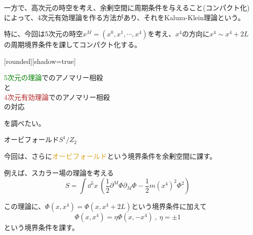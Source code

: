 \documentclass[
  unicode,a4paper,10pt,
  xcolor = {dvipsnames,svgnames},
  hyperref ={colorlinks=true,citecolor=Navy,linkcolor=NavyBlue,urlcolor=purple},
  ja=standard,lualatex
]{beamer}
\begin{document}
\begin{frame}{\subsecname}

  一方で、高次元の時空を考え、余剰空間に周期条件を与えること(コンパクト化)によって、4次元有効理論を作る方法があり、それをKaluza-Klein理論という。

  \vspace*{5pt}

  特に、今回は5次元の時空$x^{M}=(x^{0},x^{1},\cdots,x^{4})$を考え、$x^{4}$の方向に$x^{4}\sim x^{4}+2L$の周期境界条件を課してコンパクト化する。

  \pause
  \vspace*{10pt}

  [rounded][shadow=true]
  \begin{block}{}
    \centering
    \textcolor{Green}{5次元の理論}でのアノマリー相殺
    \\
    と
    \\
    \textcolor{FireBrick}{4次元有効理論}でのアノマリー相殺
    \\
    の対応
  \end{block}
  を調べたい。

\end{frame}

\begin{frame}{オービフォールド$S^{1}/Z_{2}$}

  今回は、さらに\textcolor{Goldenrod}{オービフォールド}という境界条件を余剰空間に課す。
  
  \pause
  \vspace*{10pt}

  例えば、スカラー場の理論を考える
  \begin{equation}
    S
    =
    \int\dd^5 x\ 
    \left(  
      \frac{1}{2}\partial^{M}\Phi\partial_{M}\Phi
      -
      \frac{1}{2}m(x^{4})^2\Phi^2
    \right)
    \nonumber
  \end{equation}

  この理論に、$\Phi(x,x^{4})=\Phi(x,x^{4}+2L)$という境界条件に加えて
  \begin{equation}
    \Phi(x,x^{4})
    =
    \eta
    \Phi(x,-x^{4})
    \ ,\ 
    \eta=\pm 1
    \nonumber
  \end{equation}
  という境界条件を課す。  

\end{frame}
\end{document}

